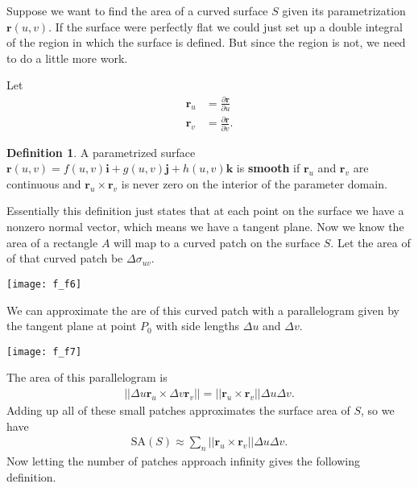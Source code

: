 \documentclass[12pt, letter]{article}
\theoremstyle{plain}
\numberwithin{theorem}{section}
\theoremstyle{definition}
\newtheorem{definition}[theorem]{Definition}
\begin{document}
\bigskip

\hrulefill

\bigskip

Suppose we want to find the area of a curved surface $S$ given its parametrization $\bm{r}(u,v)$. If the surface were perfectly flat we could just set up a double integral of the region in which the surface is defined. But since the region is not, we need to do a little more work.

\bigskip

Let 
\begin{align*}
\bm{r}_u &= \frac{\partial \bm{r}}{\partial u}\\
\bm{r}_v &= \frac{\partial \bm{r}}{\partial v}.
\end{align*}

\bigskip

\begin{definition}
A parametrized surface $\bm{r}(u,v) = f(u,v) \bm{i}+g(u,v)\bm{j}+h(u,v)\bm{k}$ is \textbf{smooth} if $\bm{r}_u$ and $\bm{r}_v$ are continuous and $\bm{r}_u \times \bm{r}_v$ is never zero on the interior of the parameter domain. 
\end{definition}

\bigskip

Essentially this definition just states that at each point on the surface we have a nonzero normal vector, which means we have a tangent plane. Now we know the area of a rectangle $A$ will map to a curved patch on the surface $S$. Let the area of of that curved patch be $\Delta \sigma_{uv}$.

\bigskip

\begin{center}
\texttt{[image: f\_f6]}
\end{center}

\bigskip

We can approximate the are of this curved patch with a parallelogram given by the tangent plane at point $P_0$ with side lengths $\Delta u$ and $\Delta v$.

\bigskip

\begin{center}
\texttt{[image: f\_f7]}
\end{center}

\bigskip

The area of this parallelogram is
\begin{align*}
||\Delta u \bm{r}_u \times \Delta v \bm{r}_v|| = ||\bm{r}_u \times \bm{r}_v|| \Delta u \Delta v.
\end{align*}
Adding up all of these small patches approximates the surface area of $S$, so we have
\begin{align*}
\text{SA}(S) \approx \sum_n ||\bm{r}_u\times \bm{r}_v|| \Delta u \Delta v.
\end{align*}
Now letting the number of patches approach infinity gives the following definition.
\end{document}

